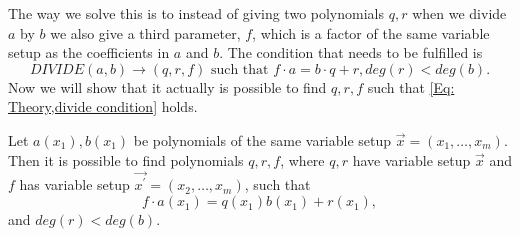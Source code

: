 The way we solve this is to instead of giving two polynomials $q,r$ when we divide $a$ by $b$ we also give a third parameter, $f$, which is a factor of the same variable setup as the coefficients in $a$ and $b$. The condition that needs to be fulfilled is
\begin{equation}\label{Eq: Theory,divide condition}
  DIVIDE(a,b) \rightarrow (q,r,f) \text{ such that } f\cdot a=b\cdot q + r, deg(r) < deg(b).
\end{equation}
Now we will show that it actually is possible to find $q,r,f$ such that \eqref{Eq: Theory,divide condition} holds.
\begin{theorem}
  Let $a(x_1),b(x_1)$ be polynomials of the same variable setup $\vec{x}=(x_1,\ldots,x_m)$. Then it is possible to find polynomials $q,r,f$, where $q,r$ have variable setup $\vec{x}$ and $f$ has variable setup $\vec{x^\prime}=(x_2,\ldots,x_m)$, such that
  \begin{equation}\label{Eq: Theory,theorem,divide}
    f\cdot a(x_1)=q(x_1)b(x_1) + r(x_1),
  \end{equation}
  and $deg(r)<deg(b)$.
\end{theorem}
